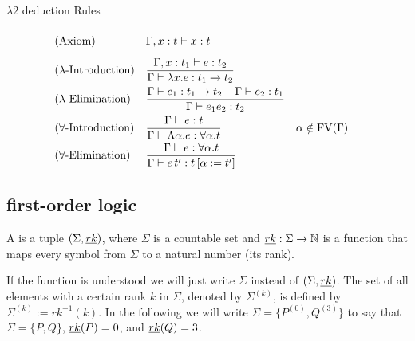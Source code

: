 $\lambda2$ deduction Rules
\begin{mdframed} 
\begingroup
\addtolength{\jot}{0.3cm}
\begin{align*}
&(\text{Axiom}) &&\Gamma,x:t\vdash x:t\vphantom{\frac{t_1}{t_1}}\\
&(\lambda\text{-Introduction}) &&\frac{\Gamma,x:t_1\vdash e:t_2}{\Gamma\vdash \lambda x.e:t_1\to t_2}\\
&(\lambda\text{-Elimination}) &&\frac{\Gamma\vdash e_1:t_1\to t_2 \hspace{0.4cm}\Gamma\vdash e_2:t_1}{\Gamma\vdash e_1e_2:t_2}\\
&(\forall\text{-Introduction}) &&\frac{\Gamma\vdash e:t}{\Gamma\vdash \Lambda\alpha.e:\forall\alpha.t} &&\alpha\notin\FV(\Gamma) \\
&(\forall\text{-Elimination}) &&\frac{\Gamma\vdash e:\forall\alpha.t }{\Gamma\vdash e\,t':t\left[ \alpha:=t'\right] }
\end{align*}
\endgroup
\end{mdframed}

\subsection{first-order logic}
\begin{definition}
A  is a tuple $(\Sigma,\emph{rk})$, where $\Sigma$ is a countable set and $\emph{rk}:\Sigma\to\mathbb{N}$ is a function that maps every symbol from $\Sigma$ to a natural number (its rank).
\end{definition}
If the function \rank{} is understood we will just write $\Sigma$ instead of $(\Sigma,\emph{rk})$. The set of all elements with a certain rank $k$ in $\Sigma$, denoted by $\Sigma^{(k)}$, is defined by $\Sigma^{(k)}:=rk^{-1}(k)$. In the following we will write $\Sigma=\{P^{(0)},Q^{(3)}\}$ to say that $\Sigma=\{P,Q\}$, $\emph{rk}(P)=0$, and $\emph{rk}(Q)=3$.

